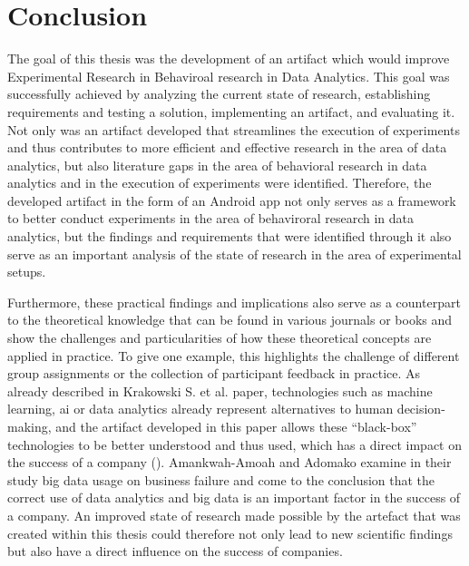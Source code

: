 \newpage\section{Conclusion}


The goal of this thesis was the development of an artifact which would improve Experimental Research in Behaviroal research in Data Analytics. This goal was successfully achieved by analyzing the current state of research, establishing requirements and testing a solution, implementing an artifact, and evaluating it. Not only was an artifact developed that streamlines the execution of experiments and thus contributes to more efficient and effective research in the area of data analytics, but also literature gaps in the area of behavioral research in data analytics and in the execution of experiments were identified. Therefore, the developed artifact in the form of an Android app not only serves as a framework to better conduct experiments in the area of behaviroral research in data analytics, but the findings and requirements that were identified through it also serve as an important analysis of the state of research in the area of experimental setups.

Furthermore, these practical findings and implications also serve as a counterpart to the theoretical knowledge that can be found in various journals or books and show the challenges and particularities of how these theoretical concepts are applied in practice. To give one example, this highlights the challenge of different group assignments or the collection of participant feedback in practice. As already described in Krakowski S. et al. paper, technologies such as machine learning, \ac{ai} or data analytics already represent alternatives to human decision-making, and the artifact developed in this paper allows these \enquote{black-box} technologies to be better understood and thus used, which has a direct impact on the success of a company (\cite{Krakowski.2023}). Amankwah-Amoah and Adomako examine in their study big data usage on business failure and come to the conclusion that the correct use of data analytics and big data is an important factor in the success of a company. An improved state of research made possible by the artefact that was created within this thesis could therefore not only lead to new scientific findings but also have a direct influence on the success of companies.

